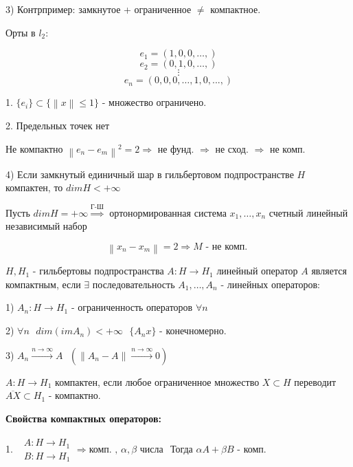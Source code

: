 \documentclass[12pt, a4paper]{report}
\begin{document}
3) Контрпример: замкнутое + ограниченное \( \neq  \) компактное. 

Орты в \( l_2 \): 

\[ e_1 = (1,0,0, \ldots, ) \] 
\[ e_2 = (0,1,0, \ldots, ) \] 
\[ \vdots  \]
\[ e_n = (0,0, 0,\ldots,1,0 ,..., ) \]  

1. \( \{e_i \}  \subset \{\left\lVert x  \right\rVert \le  1 \}\) - множество ограничено. 

2. Предельных точек нет 

Не компактно \( \left\lVert e_n - e_m \right\rVert ^2 = 2 \Rightarrow  \) не фунд. \( \Rightarrow  \) не сход. \( \Rightarrow \) не комп. 

4) Если замкнутый единичный шар в гильбертовом подпространстве \( H \) компактен, то \( dim H < + \infty  \) 

Пусть \(  dim H = + \infty \overset{\text{Г-Ш} }{\Rightarrow } \) ортонормированная система \( x_1, \ldots, x_n \) счетный линейный независимый набор 

\[ \left\lVert x_n - x_{m }  \right\rVert  =2 \Rightarrow M \text{ - не комп. } \] 

\begin{definition}
    \( H , H_1 \) - гильбертовы подпространства \( A : H \to  H_1 \) линейный оператор \( A \) является компактным, если \( \exists   \) последовательность \( A_1, \ldots, A_n\) - линейных операторов: 

    1) \( A_n : H \to  H_1 \) - ограниченность операторов \( \forall n \) 

    2) \( \forall  n \text{ }  dim(im A_n ) < + \infty \text{ }  \{A_n x \}  \) - конечномерно.

    3) \( A_n \xrightarrow{n \to  \infty  } A \text{ }  (\left\lVert A_n -A  \right\rVert \xrightarrow{ n \to  \infty } 0  )   \) 
\end{definition}

\begin{definition}
    \( A : H \to  H_1 \) компактен, если любое ограниченное множество \( X \subset H  \) переводит \( \overline{A X }  \subset H_1  \) - компактно. 
\end{definition}

\textbf{Свойства компактных операторов: } 

1. \( \begin{aligned}
\begin{aligned}
A : H \to H_1 \\
B : H \to  H_1 
\end{aligned}
\Rightarrow \text{комп. , } \alpha , \beta \text{ числа}  
\end{aligned} \) 
Тогда \( \alpha  A + \beta B  \) - комп. 
\end{document}
